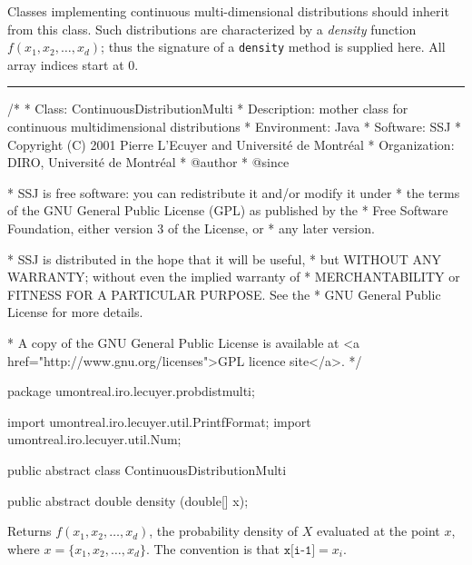 
Classes implementing continuous multi-dimensional distributions should inherit 
from this class. Such distributions are characterized by a \emph{density}
 function $f(x_1, x_2, \ldots, x_d)$;
thus the signature of a \texttt{density} method is supplied here.
All array indices start at 0.

\bigskip\hrule

\begin{code}
\begin{hide}
/*
 * Class:        ContinuousDistributionMulti
 * Description:  mother class for continuous multidimensional distributions 
 * Environment:  Java
 * Software:     SSJ 
 * Copyright (C) 2001  Pierre L'Ecuyer and Université de Montréal
 * Organization: DIRO, Université de Montréal
 * @author       
 * @since

 * SSJ is free software: you can redistribute it and/or modify it under
 * the terms of the GNU General Public License (GPL) as published by the
 * Free Software Foundation, either version 3 of the License, or
 * any later version.

 * SSJ is distributed in the hope that it will be useful,
 * but WITHOUT ANY WARRANTY; without even the implied warranty of
 * MERCHANTABILITY or FITNESS FOR A PARTICULAR PURPOSE.  See the
 * GNU General Public License for more details.

 * A copy of the GNU General Public License is available at
   <a href="http://www.gnu.org/licenses">GPL licence site</a>.
 */
\end{hide}
package umontreal.iro.lecuyer.probdistmulti;
\begin{hide}
import umontreal.iro.lecuyer.util.PrintfFormat;
import umontreal.iro.lecuyer.util.Num;
\end{hide}

public abstract class ContinuousDistributionMulti\begin{hide} {
   protected int dimension;
\end{hide}


   public abstract double density (double[] x);
\end{code}
\begin{tabb} Returns $f(x_1, x_2, \ldots, x_d)$, the probability density of
  $X$ evaluated at the point
 $x$, where $x = \{x_1, x_2, \ldots, x_d\}$. The convention is that 
  $\texttt{x[i-1]} = x_i$.
\end{tabb}
\begin{htmlonly}
\end{htmlonly}
